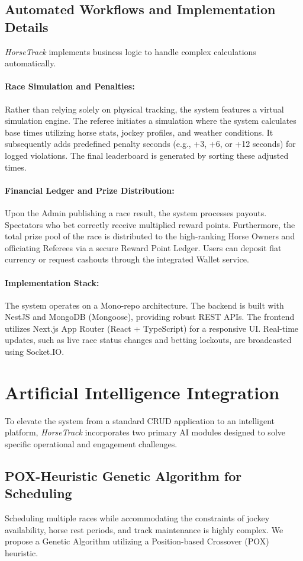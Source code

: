 \documentclass{llncs}
\begin{document}
\subsection{Automated Workflows and Implementation Details}
\textit{HorseTrack} implements business logic to handle complex calculations automatically. 
\paragraph{Race Simulation and Penalties:} Rather than relying solely on physical tracking, the system features a virtual simulation engine. The referee initiates a simulation where the system calculates base times utilizing horse stats, jockey profiles, and weather conditions. It subsequently adds predefined penalty seconds (e.g., +3, +6, or +12 seconds) for logged violations. The final leaderboard is generated by sorting these adjusted times.
\paragraph{Financial Ledger and Prize Distribution:} Upon the Admin publishing a race result, the system processes payouts. Spectators who bet correctly receive multiplied reward points. Furthermore, the total prize pool of the race is distributed to the high-ranking Horse Owners and officiating Referees via a secure Reward Point Ledger. Users can deposit fiat currency or request cashouts through the integrated Wallet service.
\paragraph{Implementation Stack:} The system operates on a Mono-repo architecture. The backend is built with NestJS and MongoDB (Mongoose), providing robust REST APIs. The frontend utilizes Next.js App Router (React + TypeScript) for a responsive UI. Real-time updates, such as live race status changes and betting lockouts, are broadcasted using Socket.IO.

\section{Artificial Intelligence Integration}
To elevate the system from a standard CRUD application to an intelligent platform, \textit{HorseTrack} incorporates two primary AI modules designed to solve specific operational and engagement challenges.

\subsection{POX-Heuristic Genetic Algorithm for Scheduling}
Scheduling multiple races while accommodating the constraints of jockey availability, horse rest periods, and track maintenance is highly complex. We propose a Genetic Algorithm utilizing a Position-based Crossover (POX) heuristic.
\end{document}
